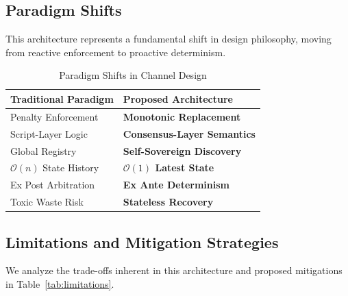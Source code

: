 \subsection{Paradigm Shifts}

This architecture represents a fundamental shift in design philosophy, moving from reactive enforcement to proactive determinism.

\begin{table}[htbp]
\centering
\caption{Paradigm Shifts in Channel Design}
\label{tab:paradigms}
\small
\begin{tabularx}{\linewidth}{@{}l X@{}}
\toprule
\textbf{Traditional Paradigm} & \textbf{Proposed Architecture} \\
\midrule
Penalty Enforcement & \textbf{Monotonic Replacement} \\
Script-Layer Logic & \textbf{Consensus-Layer Semantics} \\
Global Registry & \textbf{Self-Sovereign Discovery} \\
$\mathcal{O}(n)$ State History & \textbf{$\mathcal{O}(1)$ Latest State} \\
Ex Post Arbitration & \textbf{Ex Ante Determinism} \\
Toxic Waste Risk & \textbf{Stateless Recovery} \\
\bottomrule
\end{tabularx}
\end{table}

\subsection{Limitations and Mitigation Strategies}

We analyze the trade-offs inherent in this architecture and proposed mitigations in Table~\ref{tab:limitations}.

